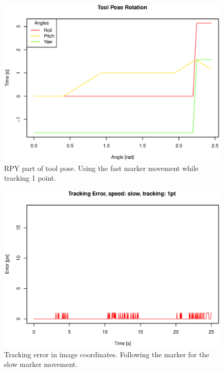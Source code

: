 \begin{figure}[H]
\centering
\includegraphics[width= \fullImageWidth]{graphics/robotics/toolPose_fast_1pt}
\caption{RPY part of tool pose. Using the fast marker movement while tracking 1 point.}
\label{fig:toolpose_fast_1p_rpy}
\end{figure}


\begin{figure}[H]
\centering
\includegraphics[width= \fullImageWidth]{graphics/robotics/trackingError_slow_1pt}
\caption{Tracking error in image coordinates.
Following the marker for the slow marker movement.}
\label{fig:trackingerror_slow_1p}
\end{figure}

